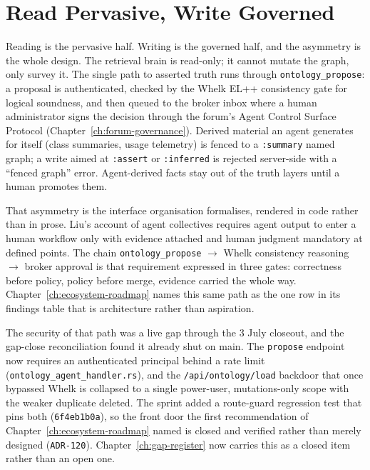 \section{Read Pervasive, Write Governed}

Reading is the pervasive half. Writing is the governed half, and the asymmetry is the
whole design. The retrieval brain is read-only; it cannot mutate the graph, only survey
it. The single path to asserted truth runs through \texttt{ontology\_propose}: a proposal
is authenticated, checked by the Whelk EL++ consistency gate for logical soundness, and
then queued to the broker inbox where a human administrator signs the decision through the
forum's Agent Control Surface Protocol (Chapter~\ref{ch:forum-governance}). Derived
material an agent generates for itself (class summaries, usage telemetry) is fenced to a
\texttt{:summary} named graph; a write aimed at \texttt{:assert} or \texttt{:inferred}
is rejected server-side with a ``fenced graph'' error. Agent-derived facts stay out of the
truth layers until a human promotes them.

That asymmetry is the interface organisation \textcite{Liu2026} formalises, rendered in
code rather than in prose. Liu's account of agent collectives requires agent output to
enter a human workflow only with evidence attached and human judgment mandatory at defined
points. The chain \texttt{ontology\_propose} $\rightarrow$ Whelk consistency reasoning
$\rightarrow$ broker approval is that requirement expressed in three gates: correctness
before policy, policy before merge, evidence carried the whole way.
Chapter~\ref{ch:ecosystem-roadmap} names this same path as the one row in its findings
table that is architecture rather than aspiration.

The security of that path was a live gap through the 3 July closeout, and the gap-close
reconciliation found it already shut on main. The \texttt{propose} endpoint now requires an
authenticated principal behind a rate limit (\texttt{ontology\_agent\_handler.rs}), and the
\texttt{/api/ontology/load} backdoor that once bypassed Whelk is collapsed to a single
power-user, mutations-only scope with the weaker duplicate deleted. The sprint added a
route-guard regression test that pins both (\texttt{6f4eb1b0a}), so the front door the first
recommendation of Chapter~\ref{ch:ecosystem-roadmap} named is closed and verified rather than
merely designed (\texttt{ADR-120}). Chapter~\ref{ch:gap-register} now carries this as a closed
item rather than an open one.

